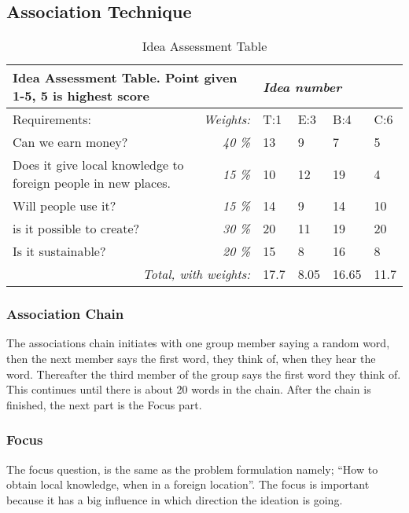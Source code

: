 \subsection{Association Technique}

\begin{table*}[t!]
\centering
\caption{Idea Assessment Table}
\label{tab:iass}
\begin{tabular}{|l|r|l|l|l|l|}
\hline
\multicolumn{2}{|l|}{\textbf{Idea Assessment Table. Point given 1-5, 5 is highest score}} & \multicolumn{4}{l|}{\textit{Idea number}} \\ \hline
Requirements: & \multicolumn{1}{l|}{\textit{Weights:}} & T:1 & E:3 & B:4 & C:6 \\ \hline
Can we earn money? & \textit{40 \%} & 13 & 9 & 7 & 5 \\ \hline
Does it give local knowledge to foreign people in new places. & \textit{15 \%} & 10 & 12 & 19 & 4 \\ \hline
Will people use it? & \textit{15 \%} & 14 & 9 & 14 & 10 \\ \hline
is it possible to create? & \textit{30 \%} & 20 & 11 & 19 & 20 \\ \hline
Is it sustainable? & \textit{20 \%} & 15 & 8 & 16 & 8 \\ \hline
\multicolumn{2}{|r|}{\textit{Total, with weights:}} & \cellcolor[HTML]{9AFF99}17.7 & \cellcolor[HTML]{FD6864}8.05 & \cellcolor[HTML]{FFFC9E}16.65 & \cellcolor[HTML]{FD6864}11.7 \\ \hline
\end{tabular}
\end{table*}

\subsubsection{Association Chain}
The associations chain initiates with one group member saying a random word, then the next member says the first word, they think of, when they hear the word. Thereafter the third member of the group says the first word they think of. This continues until there is about 20 words in the chain. After the chain is finished, the next part is the Focus part.

\subsubsection{Focus}
The focus question, is the same as the problem formulation namely; “How to obtain local knowledge, when in a foreign location”. The focus is important because it has a big influence in which direction the ideation is going. 

